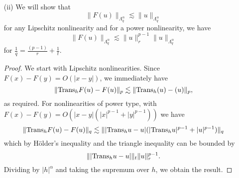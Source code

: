\documentclass[11pt]{article}
\theoremstyle{remark}
\newcommand{\1}{\textbf{1}}
\newcommand{\lle}{\lesssim}
\def\norm#1{\| #1  \|}
\newcommand{\bbR}{\mathbb{R}}
\begin{document}
\begin{enumerate}
\begin{enumerate}
\[
\norm{u}_{\Lambda_p^\alpha(\bbR^d)} := \norm{u}_{p} + \sup_{j\geq0} 2^{j\alpha} \norm{\psi_j(D)u}_p.
\]
\begin{proof}
We have to show that
\[
\sup_{j\geq0} 2^{j\alpha} \norm{\psi_j(D)u}_p \sim \sup_{0<|h|<1} \frac{\norm{\textup{Trans}_h u - u}_p}{|h|^\alpha}. 
\]
Suppose first the right side is finite. Then
\begin{align*}
\norm{\psi_j(D) u}^p_p  = \int |\int \check{\psi_j}(y) u(x-y) dy|^p dx = \int |\int \check{\psi_j}(y) [u(x-y) - u(x)] dy|^p dx
\end{align*}
and we can bound this last term by
\[
\sup_{0 < |h| < 1} \frac{\norm{\textup{Trans}_h u - u}_p}{|h|^\alpha} \int |y|^\alpha|\check{\psi_j}(y)|^p dy \lle 2^{-j\alpha} \sup_{0 < |h| < 1} \frac{\norm{\textup{Trans}_h u - u}_p}{|h|^\alpha} .
\]
Conversely, let $C:= \sup_{j\geq0} 2^{j\alpha} \norm{\psi_j(D)u}_p$ and write
\begin{align*}
\norm{u(\cdot-y) - u(\cdot)}_p &= \sum_j \norm{P_j u(\cdot -y) - P_ju(\cdot)}_p \\
&\lle \sum_{{2^j} < |y|^{-1}} \norm{P_j u(\cdot -y) - P_ju(\cdot)}_p  + \sum_{{2^j} \geq |y|^{-1}} 2 \norm{P_j u}_p \\
& \lle \sum_{{2^j} < |y|^{-1}} \norm{\nabla P_j u}_p |y| + \sum_{{2^j} \geq |y|^{-1}} 2 \norm{P_j u}_p .
\end{align*}
Now by hypothesis we have
\[
\norm{\nabla P_j u}_p \lle 2^j \norm{P_j u}_p \lle 2^{j(1-\alpha)} C.
\]
hence
\[
\norm{u(\cdot-y) - u(\cdot)}_p \lle \sum_{{2^j} < |y|^{-1}} 2^{j(1-\alpha)} C |y| + \sum_{{2^j} \geq |y|^{-1}}  C 2^{-j\alpha} \lle |y|^\alpha,
\]
proving the result.
\end{proof}
\item[(ii)] We will show that
\[
\norm{F(u)}_{\Lambda_q^\alpha} \lle \norm{u}_{\Lambda_q^\alpha}
\]
for any Lipschitz nonlinearity and for a power nonlinearity, we have
\[
\norm{F(u)}_{\Lambda_q^\alpha} \lle \norm{u}_{r}^{p-1} \norm{u}_{\Lambda_q^\alpha}
\]
for $\frac{1}{q} = \frac{(p-1)}{r} + \frac{1}{t}$.
\begin{proof}
We start with Lipschitz nonlinearities. Since $F(x) - F(y) = O(|x-y|)$, we immediately have
\[
\norm{\textup{Trans}_h F(u) - F(u)}_p  \lle \norm{\textup{Trans}_h(u) - (u)}_p,
\]
as required. For nonlinearities of power type, with $F(x) - F(y) = O(|x-y|(|x|^{p-1} + |y|^{p-1}))$ we have
\[
\norm{\textup{Trans}_h F(u) - F(u)}_q \lle \norm{|\textup{Trans}_h u - u|(|\textup{Trans}_h u|^{p-1} + |u|^{p-1})}_q
\]
which by H\"older's inequality and the triangle inequality can be bounded by
\[
\norm{|\textup{Trans}_h u - u|}_t \norm{u}_r^{p-1} .
\]
Dividing by $|h|^\alpha$ and taking the supremum over $h$, we obtain the result.
\end{proof}
\end{enumerate}
\end{enumerate}
\end{document}

